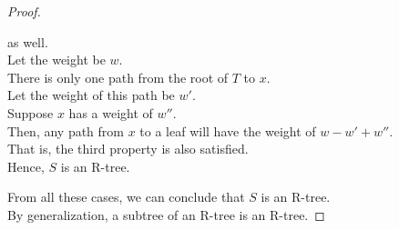 \documentclass[10pt]{article}
\begin{document}
\begin{enumerate}
\begin{proof}
\begin{addmargin}[1em]{0em}
			as well. \\
			Let the weight be $w$. \\
			There is only one path from the root of $T$ to $x$. \\
			Let the weight of this path be $w'$. \\
			Suppose $x$ has a weight of $w''$. \\
			Then, any path from $x$ to a leaf will have the weight of
			$w-w'+w''$. \\
			That is, the third property is also satisfied. \\
			Hence, $S$ is an R-tree.
		\end{addmargin}
		From all these cases, we can conclude that $S$ is an R-tree. \\
		By generalization, a subtree of an R-tree is an R-tree. 
	\end{proof}


\end{enumerate}
\end{document}
